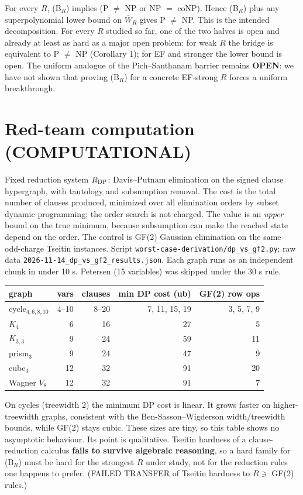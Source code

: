 \documentclass[11pt]{article}
\begin{document}
\begin{corollary}
For every $R$, (B$_R$) implies (P $\ne$ NP or NP $=$ coNP). Hence (B$_R$) plus any superpolynomial lower bound on $\overline W_R$ gives
P $\ne$ NP. This is the intended decomposition. For every $R$ studied so far, one of the two halves is open and
already at least as hard as a major open problem: for weak $R$ the bridge is equivalent to P $\ne$ NP (Corollary 1); for EF and stronger the lower bound is open.
The uniform analogue of the Pich--Santhanam barrier remains \textbf{OPEN}: we have not shown that proving (B$_R$) for a concrete
EF-strong $R$ forces a uniform breakthrough.
\end{corollary}

\section{Red-team computation (COMPUTATIONAL)}
Fixed reduction system $R_{\rm DP}$: Davis--Putnam elimination on the signed clause hypergraph,
with tautology and subsumption removal. The cost is the total number of clauses produced, minimized over all elimination orders by
subset dynamic programming; the order search is not charged. The value is an \emph{upper} bound on the true minimum, because subsumption can make
the reached state depend on the order. The control is GF(2) Gaussian elimination on the same odd-charge Tseitin
instances. Script \texttt{worst-case-derivation/dp\_vs\_gf2.py}; raw data
\texttt{2026-11-14\_dp\_vs\_gf2\_results.json}. Each graph runs as an independent chunk in under 10 s. Petersen
(15 variables) was skipped under the 30 s rule.
\begin{center}\begin{tabular}{lrrrr}
graph & vars & clauses & min DP cost (ub) & GF(2) row ops\\\hline
cycle$_{4,6,8,10}$ & 4--10 & 8--20 & 7, 11, 15, 19 & 3, 5, 7, 9\\
$K_4$ & 6 & 16 & 27 & 5\\
$K_{3,3}$ & 9 & 24 & 59 & 11\\
prism$_3$ & 9 & 24 & 47 & 9\\
cube$_3$ & 12 & 32 & 91 & 20\\
Wagner $V_8$ & 12 & 32 & 91 & 7
\end{tabular}\end{center}
On cycles (treewidth 2) the minimum DP cost is linear. It grows faster on higher-treewidth graphs,
consistent with the Ben-Sasson--Wigderson width/treewidth bounds, while GF(2) stays cubic. These sizes are tiny, so this table shows
no asymptotic behaviour. Its point is qualitative. Tseitin hardness of a clause-reduction calculus \textbf{fails to survive algebraic
reasoning}, so a hard family for (B$_R$) must be hard for the strongest $R$ under study, not
for the reduction rules one happens to prefer. (FAILED TRANSFER of Tseitin hardness to $R\ni$ GF(2) rules.)
\end{document}
